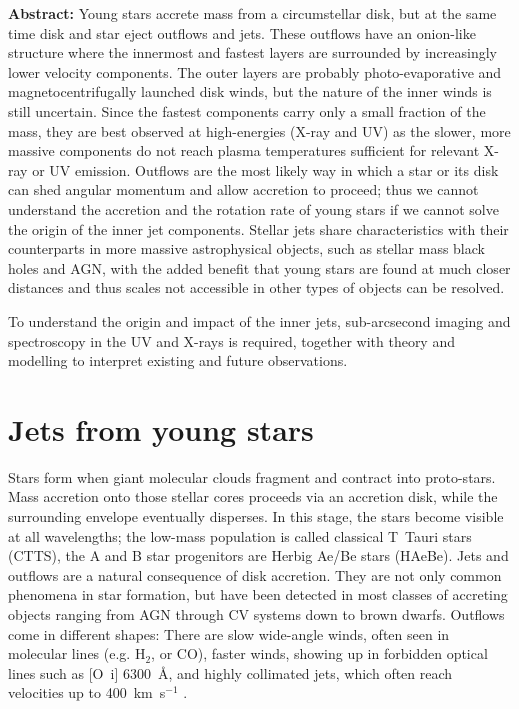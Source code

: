 \documentclass[12pt]{article}
\begin{document}
\textbf{Abstract:}
Young stars accrete mass from a circumstellar disk, but at the same time disk
and star eject outflows and jets. These outflows have an onion-like structure
where the innermost and fastest layers are surrounded by increasingly lower
velocity components. The outer layers are probably photo-evaporative and magnetocentrifugally launched disk winds, but the nature of the inner winds is still uncertain. Since the fastest components carry only a small fraction of the mass, they are best observed at high-energies (X-ray and UV) as the  slower, more massive components do not reach plasma temperatures sufficient for relevant X-ray or UV emission. Outflows are the most likely way in which a star or its disk can shed angular momentum and allow accretion to proceed; thus we cannot understand the accretion and the rotation rate of young stars if we cannot solve the origin of the inner jet components. Stellar jets share characteristics with their counterparts in more massive astrophysical objects, such as stellar mass black holes and AGN, with the added benefit that young stars are found at much closer distances and thus scales not accessible in other types of objects can be resolved.

To understand the origin and impact of the inner jets, sub-arcsecond imaging and spectroscopy in the UV and X-rays is required, together with theory and modelling to interpret existing and future observations. 

\setlength{\parindent}{2em}

\pagebreak
\section{Jets from young stars}
Stars form when giant molecular clouds fragment and contract into
proto-stars. Mass accretion onto those stellar cores proceeds via an accretion
disk, while the surrounding envelope eventually disperses. In this stage, the
stars become visible at all wavelengths; the low-mass population is called
classical T~Tauri stars (CTTS), the A and B star progenitors are Herbig Ae/Be
stars (HAeBe). Jets and outflows are a natural consequence of disk
accretion. They are not only common phenomena in star formation, but have been
detected in most classes of accreting objects ranging from AGN through CV
systems down to brown dwarfs. Outflows come in different shapes: There are slow
wide-angle winds, often seen in molecular lines (e.g. H$_2$, or CO), faster winds,
showing up in forbidden optical lines such as [O~{\sc i}] 6300~\AA{}, and highly collimated jets, which often reach velocities up to 400~km~s$^{-1}$ \citep{1998AJ....115.1554E}. 
\end{document}
